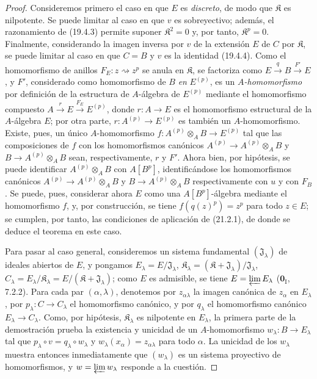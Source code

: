 \begin{proof}
Consideremos primero el caso en que $E$ es \emph{discreto}, de modo que $\mathfrak K$
es nilpotente. Se puede limitar al caso en que $v$ es sobreyectivo; además,
el razonamiento de (19.4.3) permite suponer $\mathfrak K^2=0$ y, por tanto,
$\mathfrak K^p=0$. Finalmente, considerando la imagen inversa por $v$ de la
extensión $E$ de $C$ por $\mathfrak K$, se puede limitar al caso en que $C=B$
y $v$ es la identidad (19.4.4). Como el homomorfismo de anillos
$F_E:z\rightsquigarrow z^p$ se anula en $\mathfrak K$, se factoriza como
$E\xrightarrow q B\xrightarrow{F'}E$, y $F'$, considerado como homomorfismo de
$B$ \emph{en} $E^{(p)}$, es un \emph{$A$-homomorfismo} por definición de la estructura de
$A$-álgebra de $E^{(p)}$ mediante el homomorfismo compuesto
$A\xrightarrow r E\xrightarrow{F_E}E^{(p)}$, donde $r:A\to E$ es el homomorfismo
estructural de la $A$-álgebra $E$; por otra parte,
$r:A^{(p)}\to E^{(p)}$ es también un $A$-homomorfismo. Existe, pues, un único
$A$-homomorfismo $f:A^{(p)}\otimes_A B\to E^{(p)}$ tal que las composiciones de
$f$ con los homomorfismos canónicos $A^{(p)}\to A^{(p)}\otimes_A B$ y
$B\to A^{(p)}\otimes_A B$ sean, respectivamente, $r$ y $F'$. Ahora bien, por
hipótesis, se puede identificar $A^{(p)}\otimes_A B$ con $A[B^p]$, identificándose
los homomorfismos canónicos $A^{(p)}\to A^{(p)}\otimes_A B$ y
$B\to A^{(p)}\otimes_A B$ respectivamente con $u$ y con $F_B$. Se puede, pues,
considerar ahora $E$ como una $A[B^p]$-álgebra mediante el homomorfismo $f$, y,
por construcción, se tiene $f(q(z)^p)=z^p$ para todo $z\in E$; se cumplen, por
tanto, las condiciones de aplicación de (21.2.1), de donde se deduce el
teorema en este caso.

Para pasar al caso general, consideremos un sistema fundamental
$(\mathfrak J_\lambda)$ de ideales abiertos de $E$, y pongamos
$E_\lambda=E/\mathfrak J_\lambda$,
$\mathfrak K_\lambda=(\mathfrak K+\mathfrak J_\lambda)/\mathfrak J_\lambda$,
$C_\lambda=E_\lambda/\mathfrak K_\lambda=E/(\mathfrak K+\mathfrak J_\lambda)$;
como $E$ es admisible, se tiene $E=\varprojlim E_\lambda$ ($\mathbf{0}_{\mathrm I}$, 7.2.2).
Para cada par $(\alpha,\lambda)$, denotemos por $z_{\alpha\lambda}$ la imagen
canónica de $z_\alpha$ en $E_\lambda$, por $p_\lambda:C\to C_\lambda$ el
homomorfismo canónico,
y por $q_\lambda$ el homomorfismo canónico $E_\lambda\to C_\lambda$.
Como, por hipótesis, $\mathfrak K_\lambda$ es nilpotente en $E_\lambda$, la primera
parte de la demostración prueba la existencia y unicidad de un
$A$-homomorfismo $w_\lambda:B\to E_\lambda$ tal que
$p_\lambda\circ v=q_\lambda\circ w_\lambda$ y
$w_\lambda(x_\alpha)=z_{\alpha\lambda}$ para todo $\alpha$.
La unicidad de los $w_\lambda$ muestra entonces inmediatamente que $(w_\lambda)$
es un sistema proyectivo de homomorfismos, y $w=\varprojlim w_\lambda$ responde
a la cuestión.
\end{proof}

